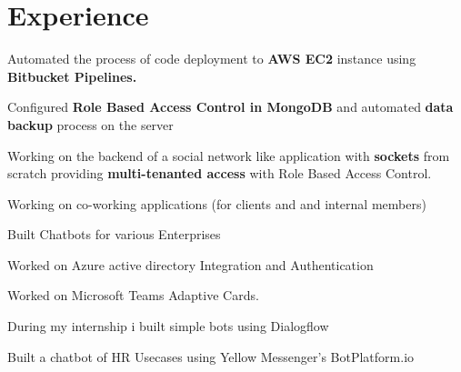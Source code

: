 \documentclass[]{deedy-resume-openfont}
\begin{document}
\begin{minipage}[t]{0.33\textwidth}
%
%

\end{minipage} 
\hfill
\begin{minipage}[t]{0.66\textwidth} 


\section{Experience}

\vspace{\topsep} %
\begin{tightemize}
\item Automated the process of code deployment to \textbf{AWS EC2} instance using \textbf{Bitbucket Pipelines.}
\item Configured \textbf{Role Based Access Control in MongoDB} and automated \textbf{data backup} process on the server
\item Working on the backend of a social network like application with \textbf{sockets} from scratch providing \textbf{multi-tenanted access} with Role Based Access Control.
\item Working on co-working applications (for clients and and internal members)

\end{tightemize}
\sectionsep

\descript{  }
\begin{tightemize}
\item Built Chatbots for various Enterprises
\item Worked on Azure active directory Integration and Authentication
\item Worked on Microsoft Teams Adaptive Cards.
\end{tightemize}

\begin{tightemize}
\item During my internship i built simple bots using Dialogflow
\item Built a chatbot of HR Usecases using Yellow Messenger's BotPlatform.io
\end{tightemize}
\sectionsep


\end{minipage}
\end{document}
